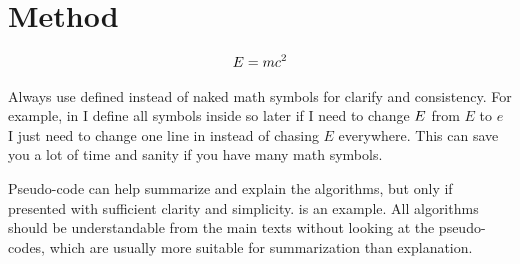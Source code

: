 \section{Method}
\label{sec:method}

\begin{align}
E = m c^2
\label{eqn:emc2}
\end{align}

Always use defined instead of naked math symbols for clarify and consistency.
For example, in  I define all symbols inside  so later if I need to change $E$ from $E$ to $e$ I just need to change one line in  instead of chasing $E$ everywhere.
This can save you a lot of time and sanity if you have many math symbols.



Pseudo-code can help summarize and explain the algorithms, but only if presented with sufficient clarity and simplicity. 
 is an example.
All algorithms should be understandable from the main texts without looking at the pseudo-codes, which are usually more suitable for summarization than explanation.

